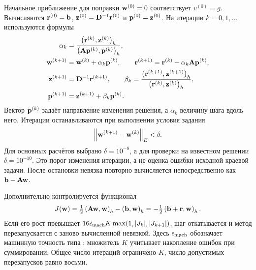 Начальное приближение для поправки $\mathbf{w}^{(0)}=0$ соответствует $v^{(0)}=g$.
Вычисляются $\mathbf{r}^{(0)}=\mathbf{b}$, $\mathbf{z}^{(0)}=\mathbf{D}^{-1}\mathbf{r}^{(0)}$ и $\mathbf{p}^{(0)}=\mathbf{z}^{(0)}$.
На итерации $k=0,1,\ldots$ используются формулы
\begin{align}
    \alpha_k        & =\frac{\left(\mathbf{r}^{(k)},\mathbf{z}^{(k)}\right)_h}
    {\left(\mathbf{A}\mathbf{p}^{(k)},\mathbf{p}^{(k)}\right)_h},                  \\
    \mathbf{w}^{(k+1)} & =\mathbf{w}^{(k)}+\alpha_k\mathbf{p}^{(k)},\qquad
    \mathbf{r}^{(k+1)}=\mathbf{r}^{(k)}-\alpha_k\mathbf{A}\mathbf{p}^{(k)},     \\
    \mathbf{z}^{(k+1)} & =\mathbf{D}^{-1}\mathbf{r}^{(k+1)},\qquad
    \beta_k=\frac{\left(\mathbf{r}^{(k+1)},\mathbf{z}^{(k+1)}\right)_h}
    {\left(\mathbf{r}^{(k)},\mathbf{z}^{(k)}\right)_h},                        \\
    \mathbf{p}^{(k+1)} & =\mathbf{z}^{(k+1)}+\beta_k\mathbf{p}^{(k)}.
\end{align}
Вектор $\mathbf{p}^{(k)}$ задаёт направление изменения решения, а $\alpha_k$ величину шага вдоль него.
Итерации останавливаются при выполнении условия задания
\begin{equation}
    \left\lVert \mathbf{w}^{(k+1)}-\mathbf{w}^{(k)}\right\rVert_E<\delta.
    \label{eq:stop}
\end{equation}
Для основных расчётов выбрано $\delta=10^{-8}$, а для проверки на известном решении $\delta=10^{-10}$.
Это порог изменения итерации, а не оценка ошибки исходной краевой задачи.
После остановки невязка повторно вычисляется непосредственно как $\mathbf{b}-\mathbf{A}\mathbf{w}$.

Дополнительно контролируется функционал
\begin{equation}
    J(\mathbf{w})=\tfrac12\left(\mathbf{A}\mathbf{w},\mathbf{w}\right)_h-\left(\mathbf{b},\mathbf{w}\right)_h =-\tfrac12\left(\mathbf{b}+\mathbf{r},\mathbf{w}\right)_h.
\end{equation}
Если его рост превышает $16\epsilon_{\rm mach}
    K\max(1,|J_k|,|J_{k+1}|)$, шаг откатывается и метод перезапускается с заново вычисленной невязкой.
Здесь $\epsilon_{\rm mach}$ обозначает машинную точность типа ; множитель $K$ учитывает накопление ошибок при суммировании.
Общее число итераций ограничено $K$, число допустимых перезапусков равно восьми.
